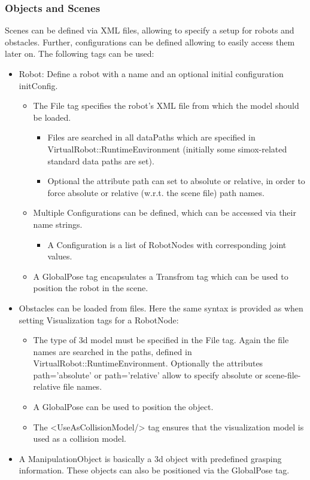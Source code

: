 \subsubsection{Objects and Scenes}
\par
Scenes can be defined via XML files, allowing to specify a setup for robots and obstacles. Further, configurations can be defined allowing to easily access them later on. The following tags can be used: 
\begin{itemize}
  \item Robot: Define a robot with a name and an optional initial configuration initConfig. 

  \begin{itemize}
    \item The File tag specifies the robot's XML file from which the model should be loaded. 
    \begin{itemize}
    \item Files are searched in all dataPaths which are specified in VirtualRobot::RuntimeEnvironment (initially some simox-related standard data paths are set). 
    \item Optional the attribute path can set to absolute or relative, in order to force absolute or relative (w.r.t. the scene file) path names. 
    \end{itemize}
    \item Multiple Configurations can be defined, which can be accessed via their name strings. 
    \begin{itemize}
    \item A Configuration is a list of RobotNodes with corresponding joint values. 
    \end{itemize}
    \item A GlobalPose tag encapsulates a Transfrom tag which can be used to position the robot in the scene. 
  \end{itemize}

  \item Obstacles can be loaded from files. Here the same syntax is provided as when setting Visualization tags for a RobotNode: 
  \begin{itemize}
       \item The type of 3d model must be specified in the File tag. Again the file names are searched in the paths, defined in VirtualRobot::RuntimeEnvironment. Optionally the attributes path='absolute' or path='relative' allow to specify absolute or scene-file-relative file names.
      \item A GlobalPose can be used to position the object.
      \item The <UseAsCollisionModel/> tag ensures that the visualization model is used as a collision model.
  \end{itemize}
\item A ManipulationObject is basically a 3d object with predefined grasping information. These objects can also be positioned via the GlobalPose tag. 
\end{itemize}
